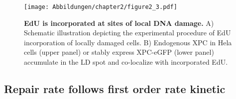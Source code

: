     
 


\begin{figure}[htbp]
\begin{center}
\texttt{[image: Abbildungen/chapter2/figure2\_3.pdf]}
\caption{\textbf{EdU is incorporated at sites of local DNA damage.} A) Schematic illustration depicting the experimental procedure of EdU incorporation of locally damaged cells. B) Endogenous XPC in Hela cells (upper panel) or stably express XPC-eGFP (lower panel) accumulate in the LD spot and co-localize with incorporated EdU.}
\label{fig:EdU_measurement}
\end{center}
\end{figure}


\subsection{Repair rate follows first order rate kinetic}

